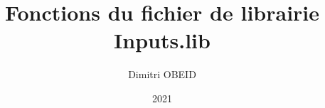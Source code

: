 \documentclass[a4paper,10pt]{article}
\title{\color{sec1}Fonctions du fichier de librairie \color{path}Inputs.lib}\color{text}
\author{Dimitri OBEID}
\date{2021}
\begin{document}
    \maketitle
    \newpage

    \hypertarget{contents}{}
    \tableofcontents
    \newpage

    \begin{abstract}

    \end{abstract}

    \section{}
\end{document}
